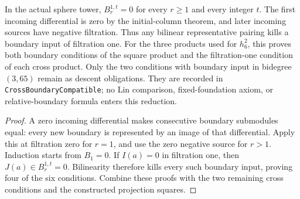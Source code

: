 \begin{proposition}
  \label{prop:h6-filtration-one-boundaries}
  \leanok
  In the actual sphere tower, $B_r^{1,t}=0$ for every $r\ge1$ and
  every integer $t$. The first incoming differential is zero by the
  initial-column theorem, and later incoming sources have negative
  filtration. Thus any bilinear representative pairing kills a boundary
  input of filtration one. For the three products used for $h_6^2$,
  this proves both boundary conditions of the square product and the
  filtration-one condition of each cross product. Only the two conditions
  with boundary input in bidegree $(3,65)$ remain as descent obligations.
  They are recorded in \texttt{CrossBoundaryCompatible}; no Lin comparison,
  fixed-foundation axiom, or relative-boundary formula enters this reduction.
\end{proposition}
\begin{proof}
  A zero incoming differential makes consecutive boundary submodules
  equal: every new boundary is represented by an image of that differential.
  Apply this at filtration zero for $r=1$, and use the zero negative
  source for $r>1$. Induction starts from $B_1=0$.
  If $I(a)=0$ in filtration one, then $J(a)\in B_r^{1,t}=0$.
  Bilinearity therefore kills every such boundary input, proving four
  of the six conditions. Combine these proofs with the two remaining
  cross conditions and the constructed projection squares.
  \leanok
\end{proof}

